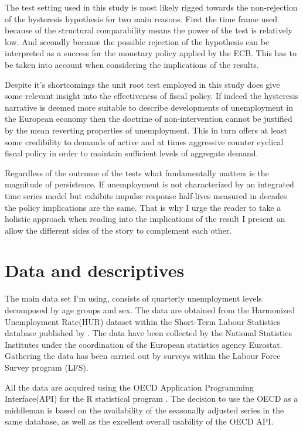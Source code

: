 \documentclass[12pt,a4paper,english]{article}
\begin{document}
The test setting used in this study is most likely rigged towards the non-rejection of the hysteresis hypothesis for two main reasons. First the time frame used because of the structural comparability means the power of the test is relatively low. And secondly because the possible rejection of the hypothesis can be interpreted as a success for the monetary policy applied by the ECB. This has to be taken into account when considering the implications of the results.

Despite it's shortcomings the unit root test employed in this study does give some relevant insight into the effectiveness of fiscal policy. If indeed the hysteresis narrative is deemed more suitable to describe developments of unemployment in the European economy then the doctrine of non-intervention cannot be justified by the mean reverting properties of unemployment. This in turn offers at least some credibility to demands of active and at times aggressive counter cyclical fiscal policy in order to maintain sufficient levels of aggregate demand. 

Regardless of the outcome of the tests what fundamentally matters is the magnitude of persistence. If unemployment is not characterized by an integrated time series model but exhibits impulse response half-lives measured in decades the policy implications are the same. That is why I urge the reader to take a holistic approach when reading into the implications of the result I present an allow the different sides of the story to complement each other.



\clearpage
\section{Data and descriptives}

The main data set I'm using, consists of quarterly unemployment levels decomposed by age groups and sex. The data are obtained from the Harmonized Unemployment Rate(HUR) dataset within the Short-Term Labour Statistics database published by \cite{oecdSTLABOUR}. The data have been collected by the National Statistics Institutes under the coordination of the European statistics agency Eurostat. Gathering the data has been carried out by surveys within the Labour Force Survey program (LFS).

All the data are acquired using the OECD Application Programming Interface(API) \citep{rOECD} for the R statistical program \citep{rBASE}. The decision to use the OECD as a middleman is based on the availability of the seasonally adjusted series in the same database, as well as the excellent overall usability of the OECD API.
\end{document}

